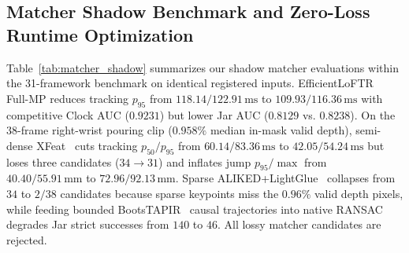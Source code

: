 \documentclass[10pt,journal]{IEEEtran}
\begin{document}
\subsection{Matcher Shadow Benchmark and Zero-Loss Runtime Optimization}
Table~\ref{tab:matcher_shadow} summarizes our shadow matcher evaluations within the 31-framework benchmark on identical registered inputs. EfficientLoFTR~\cite{eloftr} Full-MP reduces tracking $p_{95}$ from $118.14/122.91\,\mathrm{ms}$ to $109.93/116.36\,\mathrm{ms}$ with competitive Clock AUC ($0.9231$) but lower Jar AUC ($0.8129$ vs. $0.8238$). On the $38$-frame right-wrist pouring clip ($0.958\%$ median in-mask valid depth), semi-dense XFeat~\cite{xfeat} cuts tracking $p_{50}/p_{95}$ from $60.14/83.36\,\mathrm{ms}$ to $42.05/54.24\,\mathrm{ms}$ but loses three candidates ($34\to 31$) and inflates jump $p_{95}/\max$ from $40.40/55.91\,\mathrm{mm}$ to $72.96/92.13\,\mathrm{mm}$. Sparse ALIKED+LightGlue~\cite{aliked,lightglue} collapses from $34$ to $2/38$ candidates because sparse keypoints miss the $0.96\%$ valid depth pixels, while feeding bounded BootsTAPIR~\cite{bootstap} causal trajectories into native RANSAC degrades Jar strict successes from $140$ to $46$. All lossy matcher candidates are rejected.

\begin{table}[t]\centering\scriptsize
\caption{Feature matcher shadow evaluation inside the corrected BundleTrack estimator on Laval (Clock/Jar) and 38-frame wrist task clips.}\label{tab:matcher_shadow}
\end{table}
\end{document}

